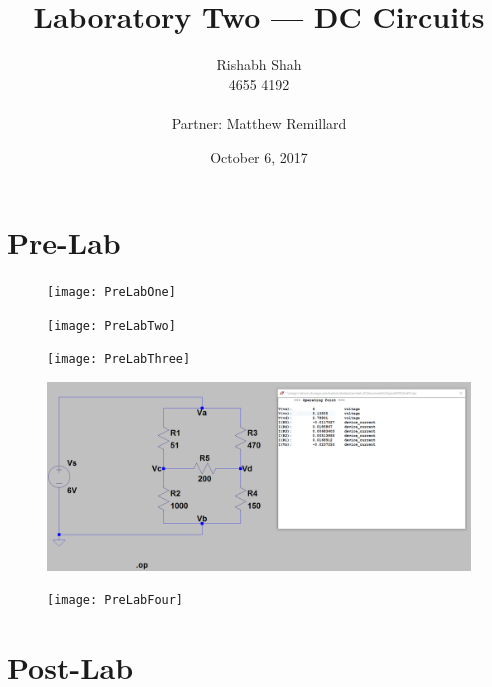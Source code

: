 \documentclass[10pt]{article}
\begin{document}
\title{Laboratory Two --- DC Circuits}
\date{October 6, 2017}
\author{Rishabh Shah\\ 4655 4192\\ \\ Partner: Matthew Remillard}
\maketitle
\newpage

\section*{Pre-Lab}
\begin{figure}[H]
	\centering
	\texttt{[image: PreLabOne]}
\end{figure}
\begin{figure}[H]
	\centering
	\texttt{[image: PreLabTwo]}
\end{figure}
\begin{figure}[H]
	\centering
	\texttt{[image: PreLabThree]}
\end{figure}
\begin{figure}[H]
	\centering
	\includegraphics[width=\textwidth]{PreLabPartFour}
\end{figure}
\begin{figure}[H]
	\centering
	\texttt{[image: PreLabFour]}
\end{figure}

\section*{Post-Lab}
\end{document}
